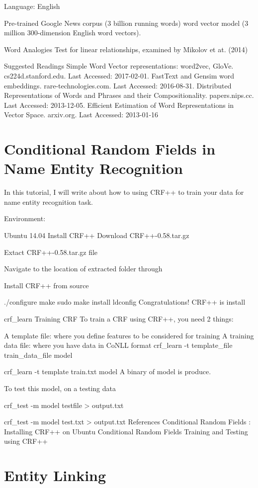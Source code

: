 Language: English

Pre-trained Google News corpus (3 billion running words) word vector model (3 million 300-dimension English word vectors).

Word Analogies
Test for linear relationships, examined by Mikolov et at. (2014)

Suggested Readings
Simple Word Vector representations: word2vec, GloVe. cs224d.stanford.edu. Last Accessed: 2017-02-01.
FastText and Gensim word embeddings. rare-technologies.com. Last Accessed: 2016-08-31.
Distributed Representations of Words and Phrases and their Compositionality. papers.nips.cc. Last Accessed: 2013-12-05.
Efficient Estimation of Word Representations in Vector Space. arxiv.org. Last Accessed: 2013-01-16

\section{Conditional Random Fields in Name Entity Recognition}

In this tutorial, I will write about how to using CRF++ to train your data for name entity recognition task.

Environment:

Ubuntu 14.04
Install CRF++
Download CRF++-0.58.tar.gz

Extact CRF++-0.58.tar.gz file

Navigate to the location of extracted folder through

Install CRF++ from source

./configure
make
sudo make install
ldconfig
Congratulations! CRF++ is install

crf_learn
Training CRF
To train a CRF using CRF++, you need 2 things:

A template file: where you define features to be considered for training
A training data file: where you have data in CoNLL format
crf_learn -t template_file train_data_file model

crf_learn -t template train.txt model
A binary of model is produce.

To test this model, on a testing data

crf_test -m model testfile > output.txt

crf_test -m model test.txt > output.txt
References
Conditional Random Fields : Installing CRF++ on Ubuntu
Conditional Random Fields Training and Testing using CRF++

\section{Entity Linking}

